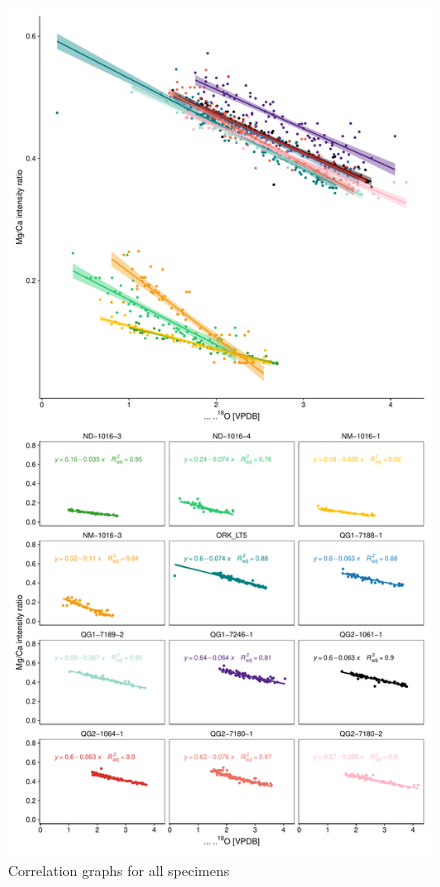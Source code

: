 \documentclass[
  authoryear,
  preprint,
  3p]{elsarticle}
\begin{document}
\begin{figure}[H]

{\centering \includegraphics{Manuscript_files/figure-pdf/Correlation Graphs-1.pdf}

}

\caption{Correlation graphs for all specimens}

\end{figure}%
\end{document}
